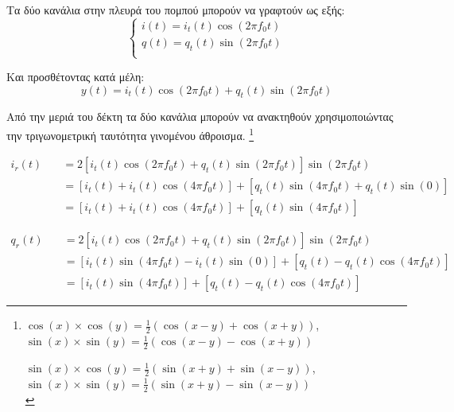 \documentclass[12pt]{report}
\begin{document}
        Τα δύο κανάλια στην πλευρά του πομπού μπορούν να γραφτούν ως εξής:\\


        \begin{equation}
            \label{eq:I/Q}
            \left\{\begin{array}{l}
                i(t) = i_t(t) \cos(2\pi f_0 t)\\
                q(t) = q_t(t) \sin(2\pi f_0 t)\\
            \end{array}\right.
        \end{equation}

        Και προσθέτοντας κατά μέλη: \begin{equation}\label{eq:I+Q}
            y(t) = i_t(t)\cos(2\pi f_0 t) + q_t(t)\sin(2\pi f_0 t)
        \end{equation}

        \newpage
        Από την μεριά του δέκτη τα δύο κανάλια μπορούν να ανακτηθούν χρησιμοποιώντας την
        τριγωνομετρική ταυτότητα γινομένου \rightarrow  άθροισμα. \footnote{
            $\cos(x) \times \cos(y) = \frac{1}{2} (\cos(x-y)+\cos(x+y))$,\qquad
            $\sin(x) \times \sin(y) = \frac{1}{2} (\cos(x-y)-\cos(x+y))$
            
            \quad
            $\sin(x) \times \cos(y) = \frac{1}{2} (\sin(x+y)+\sin(x-y))$,\qquad
            $\sin(x) \times \sin(y) = \frac{1}{2} (\sin(x+y)-\sin(x-y))$\\
        }

        \begin{align}
            i_r(t) &\quad = 2[i_t(t)\cos(2\pi f_0t) + q_t(t)\sin(2\pi f_0t)]\sin(2\pi f_0t)\nonumber\\
            &\quad = [i_t(t) + i_t(t)\cos(4\pi f_0t)]+[q_t(t)\sin(4\pi f_0t)+q_t(t)\sin(0)] \label{eq:Irec}\\
            &\quad = [i_t(t) + i_t(t)\cos(4\pi f_0t)]+[q_t(t)\sin(4\pi f_0t)]\nonumber            
        \end{align}

        \begin{align}
            q_r(t) &\quad = 2[i_t(t)\cos(2\pi f_0t) + q_t(t)\sin(2\pi f_0t)]\sin(2\pi f_0t)\nonumber\\
            &\quad = [i_t(t)\sin(4\pi f_0t)-i_t(t)\sin(0)] + [q_t(t)-q_t(t)\cos(4\pi f_0t)]\label{eq:Qrec}\\
            &\quad = [i_t(t)\sin(4\pi f_0t)] + [q_t(t)-q_t(t)\cos(4\pi f_0t)]\nonumber
        \end{align}
\end{document}
